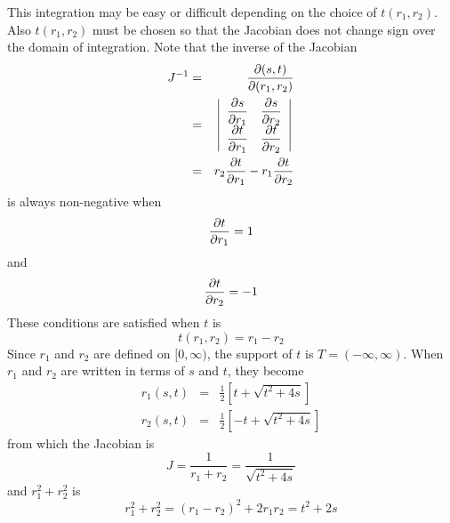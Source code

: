 This integration may be easy or difficult depending on the choice of
$t(r_1,r_2)$.  Also $t(r_1,r_2)$ must be chosen so that the Jacobian does 
not change sign over the domain of integration.
Note that the inverse of the Jacobian
\begin{eqnarray}
J^{-1}&=&\frac{{\partial}(s,t)}{{\partial}(r_1,r_2)} {\nonumber}\\
&=&\left|\begin{array}{cc}
\displaystyle\frac{{\partial} s}{{\partial} r_1} & 
\displaystyle\frac{{\partial} s}{{\partial} r_2} \\ 
\displaystyle\frac{{\partial} t}{{\partial} r_1} & 
\displaystyle\frac{{\partial} t}{{\partial} r_2}  
\end{array}\right|	{\nonumber}\\
&=& r_2\frac{{\partial} t}{{\partial} r_1}-r_1\frac{{\partial} t}{{\partial} r_2} 
\end{eqnarray}
is always non-negative when
\begin{equation}
\frac{{\partial} t}{{\partial} r_1}=1
\end{equation}
and
\begin{equation}
\frac{{\partial} t}{{\partial} r_2}=-1
\end{equation}
These conditions are satisfied when $t$ is
\begin{equation}
t(r_1,r_2)=r_1-r_2
\end{equation}
Since $r_1$ and $r_2$ are defined on $[0,\infty)$, the support of $t$ is
$T=(-\infty,\infty)$.  When $r_1$ and $r_2$ are written in terms of $s$ 
and $t$, they become
\begin{eqnarray}
r_1(s,t)&=&\frac{1}{2}\left[t+\sqrt{t^2+4s}\right]\\
r_2(s,t)&=&\frac{1}{2}\left[-t+\sqrt{t^2+4s}\right]
\end{eqnarray}
from which the Jacobian is
\begin{equation}
J=\frac{1}{r_1+r_2}=\frac{1}{\sqrt{t^2+4s}}
\end{equation}
and $r_1^2+r_2^2$ is
\begin{equation}
r_1^2+r_2^2=(r_1-r_2)^2+2r_1r_2=t^2+2s
\end{equation}

